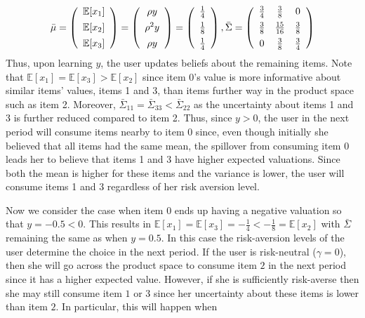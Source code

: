 \documentclass[format=acmsmall, review=false]{acmart}
\begin{document}
\[ \bar{\mu} =   \left (\begin{array}{c}
\mathbb{E}[x_1] \vspace{0.15cm} \\
\mathbb{E}[x_2] \vspace{0.15cm} \\
\mathbb{E}[x_3]
\end{array}  \right) =\left (\begin{array}{c}
\rho y  \vspace{0.15cm} \\
\rho^{2} y  \vspace{0.15cm} \\
 \rho y \\
\end{array} \right) =
\left (\begin{array}{c}
\frac{1}{4} \vspace{0.15cm} \\
\frac{1}{8}  \vspace{0.15cm} \\
\frac{1}{4}
\end{array}  \right), \bar{\Sigma} =  \left( \begin{array}{ccc}
\frac{3}{4} & \frac{3}{8} & 0 \vspace{0.15cm} \\
\frac{3}{8} & \frac{15}{16} & \frac{3}{8} \vspace{0.15cm}  \\
0 &\frac{3}{8} & \frac{3}{4}  \\
\end{array} \right)
\]
Thus, upon learning $y$, the user updates beliefs about the remaining items. Note that $\mathbb{E}[x_1] = \mathbb{E}[x_3] > \mathbb{E}[x_2]$ since item 0's value is more informative about similar items' values, items 1 and 3, than items further way in the product space such as item 2. Moreover, $\bar{\Sigma}_{11} = \bar{\Sigma}_{33} < \bar{\Sigma}_{22}$ as the uncertainty about items 1 and 3 is further reduced compared to item 2. Thus, since $y > 0$, the user in the next period will consume items nearby to item 0 since, even though initially she believed that all items had the same mean, the spillover from consuming item 0 leads her to believe that items 1 and 3 have higher expected valuations. Since both the mean is higher for these items and the variance is lower, the user will consume items 1 and 3 regardless of her risk aversion level.
\par 
Now we consider the case when item 0 ends up having a negative valuation so that $y = -0.5 < 0$. This results in $\mathbb{E}[x_1] = \mathbb{E}[x_3] = -\frac{1}{4} <  -\frac{1}{8} = \mathbb{E}[x_2]$ with $\bar{\Sigma}$ remaining the same as when $y = 0.5$. In this case the risk-aversion levels of the user determine the choice in the next period. If the user is risk-neutral ($\gamma = 0$), then she will go across the product space to consume item $2$ in the next period since it has a higher expected value. However, if she is sufficiently risk-averse then she may still consume item $1$ or $3$ since her uncertainty about these items is lower than item $2$. In particular, this will happen when 
\end{document}
